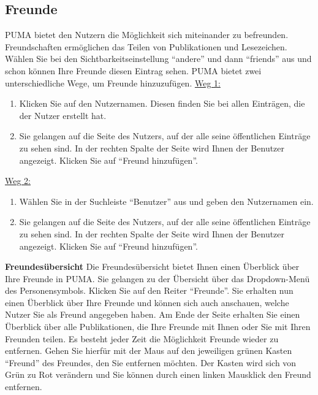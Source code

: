 \documentclass[b5paper,11pt,twoside]{scrbook} %
\begin{document}
\subsection{Freunde}%
PUMA bietet den Nutzern die Möglichkeit sich miteinander zu befreunden. Freundschaften ermöglichen das Teilen von Publikationen und Lesezeichen. Wählen Sie bei den Sichtbarkeitseinstellung \enquote{andere} und dann \enquote{friends} aus und schon können Ihre Freunde diesen Eintrag sehen.
PUMA bietet zwei unterschiedliche Wege, um Freunde hinzuzufügen.
\newline
\newline
\underline{Weg 1:}
\begin{enumerate}
    \item Klicken Sie auf den Nutzernamen. Diesen finden Sie bei allen Einträgen, die der Nutzer erstellt hat.
    \item Sie gelangen auf die Seite des Nutzers, auf der alle seine öffentlichen Einträge zu sehen sind. In der rechten Spalte der Seite wird Ihnen der Benutzer angezeigt. Klicken Sie auf \enquote{Freund hinzufügen}.
\end{enumerate}
\underline{Weg 2:}
\begin{enumerate}
    \item Wählen Sie in der Suchleiste \enquote{Benutzer} aus und geben den Nutzernamen ein.
    \item Sie gelangen auf die Seite des Nutzers, auf der alle seine öffentlichen Einträge zu sehen sind. In der rechten Spalte der Seite wird Ihnen der Benutzer angezeigt. Klicken Sie auf \enquote{Freund hinzufügen}.
\end{enumerate}
\textbf{Freundesübersicht} \newline
Die Freundesübersicht bietet Ihnen einen Überblick über Ihre Freunde in PUMA. Sie gelangen zu der Übersicht über das Dropdown-Menü des Personensymbols. Klicken Sie auf den Reiter \enquote{Freunde}. Sie erhalten nun einen Überblick über Ihre Freunde und können sich auch anschauen, welche Nutzer Sie als Freund angegeben haben. Am Ende der Seite erhalten Sie einen Überblick über alle Publikationen, die Ihre Freunde mit Ihnen oder Sie mit Ihren Freunden teilen.\newline
Es besteht jeder Zeit die Möglichkeit Freunde wieder zu entfernen. Gehen Sie hierfür mit der Maus auf den jeweiligen grünen Kasten \enquote{Freund} des Freundes, den Sie entfernen möchten. Der Kasten wird sich von Grün zu Rot verändern und Sie können durch einen linken Mausklick den Freund entfernen. 
\end{document}
